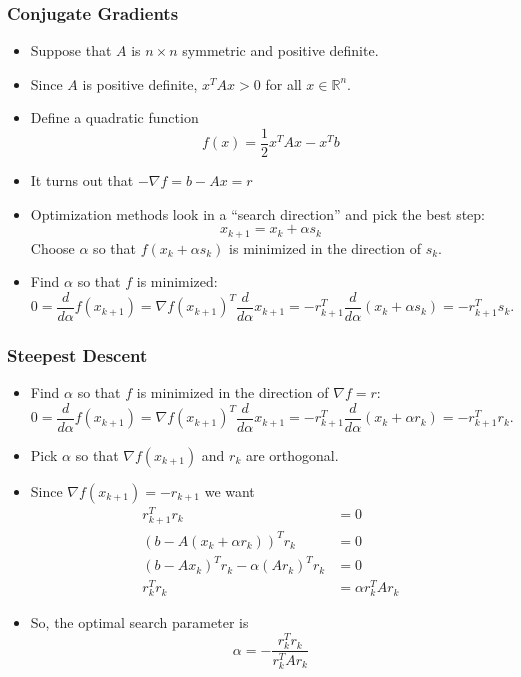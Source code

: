 \documentclass[10pt]{beamer}
\begin{document}
\begin{frame}
\frametitle{Conjugate Gradients}
\begin{itemize}
\item Suppose that $A$ is $n \times n$ symmetric and positive definite. 

\item Since $A$ is positive definite, $x^T A x > 0$ for all $x \in
\mathbb{R}^n$.

\item Define a quadratic function
\[
f(x) = \frac{1}{2} x^T A x - x^T b
\]

\item It turns out that $- \nabla f = b-Ax = r$

\item Optimization methods look in a ``search direction'' and pick the best
step:
\[
x_{k+1} = x_k + \alpha s_k
\]
Choose $\alpha$ so that $f(x_k + \alpha s_k)$ is minimized in the direction
of $s_k$.

\item Find $\alpha$ so that $f$ is minimized:
\[
0 = \frac{d}{d\alpha}f(x_{k+1}) 
  = \nabla f(x_{k+1})^T \frac{d}{d\alpha}x_{k+1} 
 = -r_{k+1}^T \frac{d}{d\alpha}(x_k + \alpha s_k) 
 = -r_{k+1}^T s_k.
\]
\end{itemize}
\end{frame}

\begin{frame}
\frametitle{Steepest Descent}
\begin{itemize}
\item Find $\alpha$ so that $f$ is minimized in the direction of $\nabla f = r$:
\[
0 = \frac{d}{d\alpha}f(x_{k+1}) 
  = \nabla f(x_{k+1})^T \frac{d}{d\alpha}x_{k+1} 
 = -r_{k+1}^T \frac{d}{d\alpha}(x_k + \alpha r_k) 
 = -r_{k+1}^T r_k.
\]
\item Pick $\alpha$ so that $\nabla f(x_{k+1})$ and $r_k$ are orthogonal.
\item Since $\nabla f(x_{k+1}) = -r_{k+1}$ we want
\begin{align*}
r_{k+1}^T r_k & = 0\\
(b - A(x_k + \alpha r_k))^T r_k &= 0\\
(b-A x_k)^T r_k - \alpha (Ar_k)^T r_k & = 0\\
r_k^T r_k &= \alpha r_k^T A r_k
\end{align*}
\item So, the optimal search parameter is
\[
  \alpha = -\frac{r_k^T r_k}{r_k^T A r_k}
\]
\end{itemize}
\end{frame}
\end{document}
